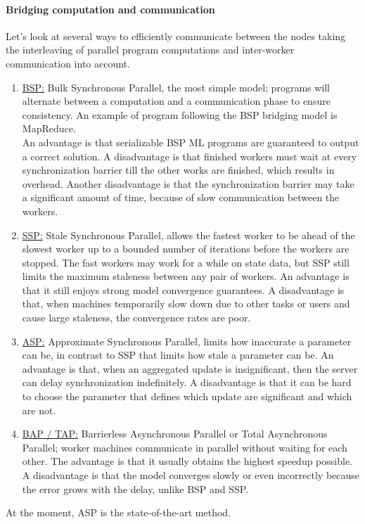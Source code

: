 \paragraph{Bridging computation and communication}
Let's look at several ways to efficiently communicate between the nodes taking the interleaving of parallel program computations and inter-worker communication into account.
\begin{enumerate}
	\item \underline{BSP:} Bulk Synchronous Parallel, the most simple model; programs will alternate between a computation and a communication phase to ensure consistency\cite{Xing16}. An example of program following the BSP bridging model is MapReduce.\\
	An advantage is that serializable BSP ML programs are guaranteed to output a correct solution. A disadvantage is that finished workers must wait at every synchronization barrier till the other works are finished, which results in overhead\cite{Chilimbi14}. Another disadvantage is that the synchronization barrier may take a significant amount of time, because of slow communication between the workers.
	\item \underline{SSP:} Stale Synchronous Parallel, allows the fastest worker to be ahead of the slowest worker up to a bounded number of iterations before the workers are stopped. The fast workers may work for a while on state data, but SSP still limits the maximum staleness between any pair of workers. An advantage is that it still enjoys strong model convergence guarantees. A disadvantage is that, when machines temporarily slow down due to other tasks or users and cause large staleness, the convergence rates are poor.
	\item \underline{ASP:} Approximate Synchronous Parallel, limits how inaccurate a parameter can be, in contrast to SSP that limits how stale a parameter can be. An advantage is that, when an aggregated update is insignificant, then the server can delay synchronization indefinitely. A disadvantage is that it can be hard to choose the parameter that defines which update are significant and which are not. \cite{Hsieh17}
	\item \underline{BAP / TAP:} Barrierless Asynchronous Parallel\cite{Han15} or Total Asynchronous Parallel\cite{Hsieh17}; worker machines communicate in parallel without waiting for each other. The advantage is that it usually obtains the highest speedup possible. A disadvantage is that the model converges slowly or even incorrectly because the error grows with the delay, unlike BSP and SSP. \cite{Han15}
\end{enumerate}
At the moment, ASP is the state-of-the-art method.


